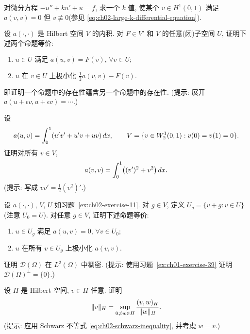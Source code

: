 \begin{MBExercise}
\label{ex:ch02-exercise-10}
对微分方程 $-u''+ku'+u=f$, 求一个 $k$ 值, 使某个 $v\in H^1(0,1)$ 满足 $a(v,v)=0$ 但 $v\not\equiv0$(参见 \eqref{eq:ch02-large-k-differential-equation}).
\end{MBExercise}

\begin{MBExercise}
\label{ex:ch02-exercise-11}
设 $a(\cdot,\cdot)$ 是 Hilbert 空间 $V$ 的内积. 对 $F\in V'$ 和 $V$ 的任意(闭)子空间 $U$, 证明下述两个命题等价:
\begin{enumerate}
\item[(a)] $u\in U$ 满足 $a(u,v)=F(v)$, $\forall v\in U$;
\item[(b)] $u$ 在 $v\in U$ 上极小化 $\frac12a(v,v)-F(v)$.
\end{enumerate}
即证明一个命题中的存在性蕴含另一个命题中的存在性. (提示: 展开 $a(u+\epsilon v,u+\epsilon v)=\cdots$.)
\end{MBExercise}

\begin{MBExercise}
\label{ex:ch02-exercise-12}
设
\[
\MathBookFormulaID{formula-ch02-exercise-12-form-space}
a(u,v)=\int_0^1(u'v'+u'v+uv)\,dx,
\qquad
V=\{v\in W_2^1(0,1):v(0)=v(1)=0\}.
\]
证明对所有 $v\in V$,
\[
\MathBookFormulaID{formula-ch02-exercise-12-identity}
a(v,v)=\int_0^1\bigl((v')^2+v^2\bigr)\,dx.
\]
(提示: 写成 $vv'=\frac12(v^2)'$.)
\end{MBExercise}

\begin{MBExercise}
\label{ex:ch02-exercise-13}
设 $a(\cdot,\cdot)$, $V$, $U$ 如习题~\ref{ex:ch02-exercise-11}. 对 $g\in V$, 定义 $U_g=\{v+g:v\in U\}$(注意 $U_0=U$). 对任意 $g\in V$, 证明下述命题等价:
\begin{enumerate}
\item[(a)] $u\in U_g$ 满足 $a(u,v)=0$, $\forall v\in U_0$;
\item[(b)] $u$ 在所有 $v\in U_g$ 上极小化 $a(v,v)$.
\end{enumerate}
\end{MBExercise}

\begin{MBExercise}
\label{ex:ch02-exercise-14}
证明 $\mathcal D(\Omega)$ 在 $L^2(\Omega)$ 中稠密. (提示: 使用习题~\ref{ex:ch01-exercise-39} 证明 $\mathcal D(\Omega)^\perp=\{0\}$.)
\end{MBExercise}

\begin{MBExercise}
\label{ex:ch02-exercise-15}
设 $H$ 是 Hilbert 空间, $v\in H$ 任意. 证明
\[
\MathBookFormulaID{formula-ch02-exercise-15-dual-characterization}
\|v\|_H=\sup_{0\neq w\in H}\frac{(v,w)_H}{\|w\|_H}.
\]
(提示: 应用 Schwarz 不等式 \eqref{eq:ch02-schwarz-inequality}, 并考虑 $w=v$.)
\end{MBExercise}
